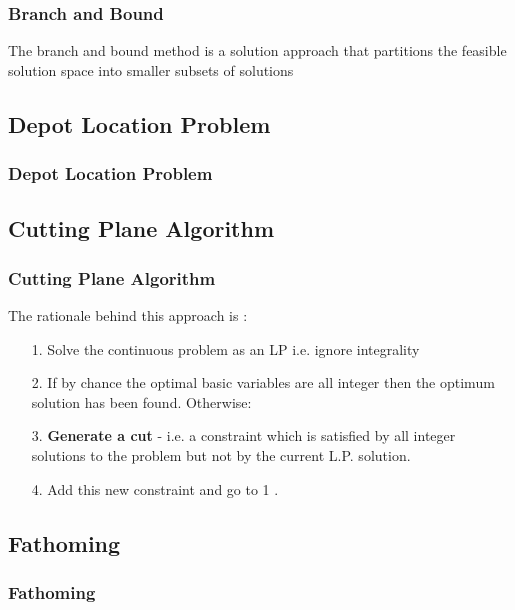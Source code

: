 \documentclass{beamer}
\begin{document}
\begin{frame}
	\frametitle{Branch and Bound}
\begin{framed}
The branch and bound method is a solution approach that partitions the feasible solution space into smaller subsets of solutions
\end{framed}
\end{frame}

\subsection{Depot Location Problem}
\begin{frame}
\frametitle{Depot Location Problem} %
\end{frame}
\subsection{Cutting Plane Algorithm}
\begin{frame}
	\frametitle{Cutting Plane Algorithm} 
The rationale behind this approach is :
\begin{itemize}
\item[1.] Solve the continuous problem as an LP i.e. ignore integrality
\item[2.] If by chance the optimal basic variables are all integer then the optimum solution has been found.
Otherwise:
\item[3.] \textbf{Generate a cut} - i.e. a constraint which is satisfied by all integer solutions to the problem but not by the 
current L.P. solution.
\item[4.] Add this new constraint and go to 1 .

\end{itemize}
\end{frame}
\subsection{Fathoming}
\begin{frame}
\frametitle{Fathoming}
\Large
	
\end{frame}
\end{document}
